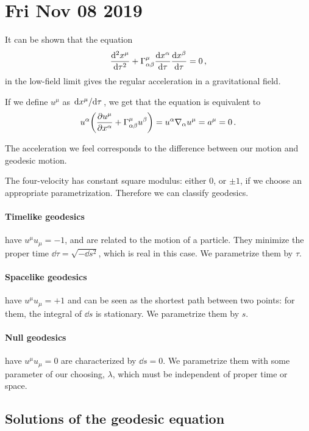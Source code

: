 \documentclass[main.tex]{subfiles}
\begin{document}
\section*{Fri Nov 08 2019}

It can be shown that the equation 
%
\begin{align}
  \dv[2]{x^{\mu }}{\tau } + \Gamma^{\mu }_{\alpha \beta } \dv{x^{\alpha }}{\tau } \dv{x^{\beta }}{\tau } = 0
\,,
\end{align}
%
in the low-field limit gives the regular acceleration in a gravitational field.

If we define \(u^{\mu }\) as \(\dv*{x^{\mu }}{\tau }\), we get that the equation is equivalent to 
%
\begin{align}
  u^{\alpha } \qty(\pdv{u^{\mu } }{x^{\alpha }} + \Gamma^{\mu }_{\alpha \beta }u^{\beta }) = u^{\alpha } \nabla_{\alpha } u^{\mu } = a^{\mu } = 0
\,.
\end{align}

The acceleration we feel corresponds to the difference between our motion and geodesic motion.

The four-velocity has constant square modulus: either 0, or \(\pm 1\), if we choose an appropriate parametrization. Therefore we can classify geodesics.

\paragraph{Timelike geodesics} have \(u^{\mu } u_{\mu } = -1\), and are related to the motion of a particle. They minimize the proper time \(\dd{\tau} = \sqrt{-\dd{s^2}}\), which is real in this case. We parametrize them by \(\tau \).

\paragraph{Spacelike geodesics} have \(u^{\mu } u_{\mu } = +1\) and can be seen as the shortest path between two points: for them, the integral of \(\dd{s}\) is stationary. We parametrize them by \(s\).

\paragraph{Null geodesics} have \(u^{\mu } u_{\mu } = 0\) are characterized by \(\dd{s}=0\). We parametrize them with some parameter of our choosing, \(\lambda \), which must be independent of proper time or space.

\subsection{Solutions of the geodesic equation}
\end{document}
